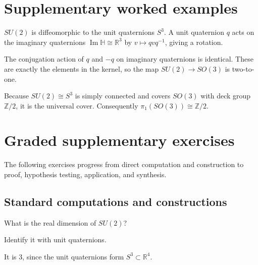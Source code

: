 \section{Supplementary worked examples}
\label{sec:viii13-pedagogy}

\begin{example}\label{ex:viii13-ped-01}
$SU(2)$ is diffeomorphic to the unit quaternions $S^3$.  A unit quaternion $q$ acts on the imaginary quaternions $\operatorname{Im}\mathbb H\cong\mathbb R^3$ by $v\mapsto qvq^{-1}$, giving a rotation.
\end{example}

\begin{example}[Kernel $\{\pm1\}$]\label{ex:viii13-ped-02}
The conjugation action of $q$ and $-q$ on imaginary quaternions is identical.  These are exactly the elements in the kernel, so the map $SU(2)\to SO(3)$ is two-to-one.
\end{example}

\begin{example}\label{ex:viii13-ped-03}
Because $SU(2)\cong S^3$ is simply connected and covers $SO(3)$ with deck group $\mathbb Z/2$, it is the universal cover.  Consequently $\pi_1(SO(3))\cong\mathbb Z/2$.
\end{example}

\section{Graded supplementary exercises}
The following exercises progress from direct computation and construction to proof, hypothesis testing, application, and synthesis.

\subsection*{Standard computations and constructions}

\begin{exercise}[Dimension]\label{exr:viii13-ped-01}
What is the real dimension of $SU(2)$?
\end{exercise}
\begin{hint}
Identify it with unit quaternions.
\end{hint}
\begin{solution}
It is 3, since the unit quaternions form $S^3\subset\mathbb R^4$.
\end{solution}

